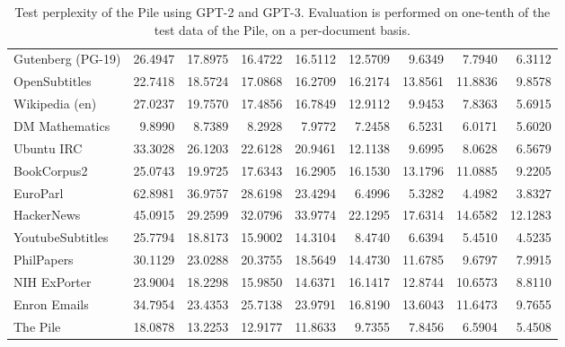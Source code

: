 \documentclass[11pt,a4paper]{article}
\begin{document}
\begin{appendices}
\begin{table}[p]
{\begin{tabular}{l rrrr rrrr}
    Gutenberg (PG-19) & 26.4947 & 17.8975 & 16.4722 & 16.5112 & 12.5709 & 9.6349 & 7.7940 & 6.3112 \\
    OpenSubtitles & 22.7418 & 18.5724 & 17.0868 & 16.2709 & 16.2174 & 13.8561 & 11.8836 & 9.8578 \\
    Wikipedia (en) & 27.0237 & 19.7570 & 17.4856 & 16.7849 & 12.9112 & 9.9453 & 7.8363 & 5.6915 \\
    DM Mathematics & 9.8990 & 8.7389 & 8.2928 & 7.9772 & 7.2458 & 6.5231 & 6.0171 & 5.6020 \\
    Ubuntu IRC & 33.3028 & 26.1203 & 22.6128 & 20.9461 & 12.1138 & 9.6995 & 8.0628 & 6.5679 \\
    BookCorpus2 & 25.0743 & 19.9725 & 17.6343 & 16.2905 & 16.1530 & 13.1796 & 11.0885 & 9.2205 \\
    EuroParl & 62.8981 & 36.9757 & 28.6198 & 23.4294 & 6.4996 & 5.3282 & 4.4982 & 3.8327 \\
    HackerNews & 45.0915 & 29.2599 & 32.0796 & 33.9774 & 22.1295 & 17.6314 & 14.6582 & 12.1283 \\
    YoutubeSubtitles & 25.7794 & 18.8173 & 15.9002 & 14.3104 & 8.4740 & 6.6394 & 5.4510 & 4.5235 \\
    PhilPapers & 30.1129 & 23.0288 & 20.3755 & 18.5649 & 14.4730 & 11.6785 & 9.6797 & 7.9915 \\
    NIH ExPorter & 23.9004 & 18.2298 & 15.9850 & 14.6371 & 16.1417 & 12.8744 & 10.6573 & 8.8110 \\
    Enron Emails & 34.7954 & 23.4353 & 25.7138 & 23.9791 & 16.8190 & 13.6043 & 11.6473 & 9.7655 \\
    \midrule
    The Pile & 18.0878 & 13.2253 & 12.9177 & 11.8633 & 9.7355 & 7.8456 & 6.5904 & 5.4508 \\
        \bottomrule
    \end{tabular}
}
\caption{Test perplexity of the Pile using GPT-2 and GPT-3. Evaluation is performed on one-tenth of the test data of the Pile, on a per-document basis.}
\label{table:pile_perplexity}
\end{table}


\end{appendices}
\end{document}
